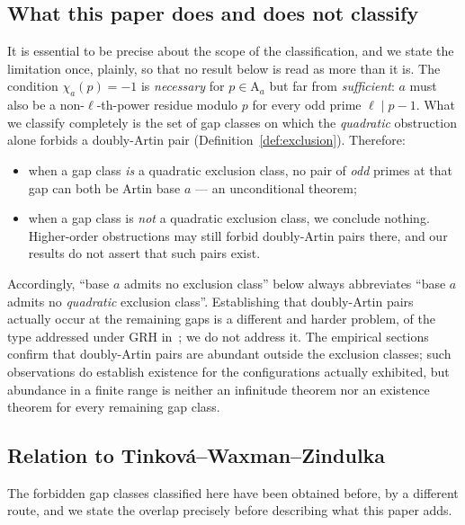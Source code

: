 \documentclass[11pt,reqno]{amsart}
\theoremstyle{plain}
\theoremstyle{definition}
\newcommand{\Art}{\mathrm{A}}
\begin{document}
\subsection*{What this paper does and does not classify}
It is essential to be precise about the scope of the classification, and we
state the limitation once, plainly, so that no result below is read as more
than it is. The condition $\chi_a(p) = -1$ is \emph{necessary} for $p \in
\Art_a$ but far from \emph{sufficient}: $a$ must also be a non-$\ell$-th-power
residue modulo $p$ for every odd prime $\ell \mid p-1$. What we classify
completely is the set of gap classes on which the \emph{quadratic} obstruction
alone forbids a doubly-Artin pair (Definition~\ref{def:exclusion}). Therefore:

\begin{itemize}
\item when a gap class \emph{is} a quadratic exclusion class, no pair of
      \emph{odd} primes at that gap can both be Artin base $a$ --- an
      unconditional theorem;
\item when a gap class is \emph{not} a quadratic exclusion class, we conclude
      nothing. Higher-order obstructions may still forbid doubly-Artin pairs
      there, and our results do not assert that such pairs exist.
\end{itemize}

Accordingly, ``base $a$ admits no exclusion class'' below always abbreviates
``base $a$ admits no \emph{quadratic} exclusion class''. Establishing that
doubly-Artin pairs actually occur at the remaining gaps is a different and
harder problem, of the type addressed under GRH in~\cite{Pollack2014}; we do
not address it. The empirical sections confirm that doubly-Artin pairs are
abundant outside the exclusion classes; such observations do establish
existence for the configurations actually exhibited, but abundance in a finite
range is neither an infinitude theorem nor an existence theorem for every
remaining gap class.

\subsection*{Relation to Tinkov\'a--Waxman--Zindulka}
\label{sec:twz}

The forbidden gap classes classified here have been obtained before, by a
different route, and we state the overlap precisely before describing what
this paper adds.
\end{document}
